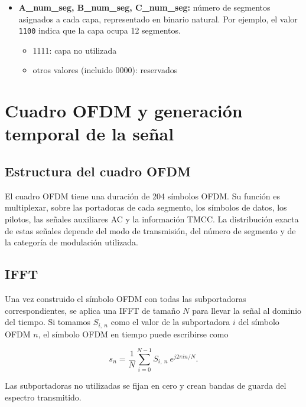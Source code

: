\begin{itemize}
\item \textbf{A\_num\_seg, B\_num\_seg, C\_num\_seg:} número de segmentos asignados a cada capa, representado en binario natural. Por ejemplo, el valor \texttt{1100} indica que la capa ocupa 12 segmentos.
\begin{itemize}
\item 1111: capa no utilizada
\item otros valores (incluido 0000): reservados
\end{itemize}

\end{itemize}


\section{Cuadro OFDM y generación temporal de la señal}

\subsection{Estructura del cuadro OFDM}

El cuadro OFDM tiene una duración de 204 símbolos OFDM. Su función es multiplexar, sobre las portadoras de cada segmento, los símbolos de datos, los pilotos, las señales auxiliares AC y la información TMCC. La distribución exacta de estas señales depende del modo de transmisión, del número de segmento y de la categoría de modulación utilizada.


\subsection{IFFT}

Una vez construido el símbolo OFDM con todas las subportadoras correspondientes, se aplica una IFFT de tamaño $N$ para llevar la señal al dominio del tiempo. Si tomamos $S_{i,\ n}$ como el valor de la subportadora $i$ del símbolo OFDM $n$, el símbolo OFDM en tiempo puede escribirse como

\begin{equation}
s_n =
\frac{1}{N}
\sum_{i=0}^{N-1}
S_{i,\ n}\ e^{j2\pi in/N}.
\end{equation}

Las subportadoras no utilizadas se fijan en cero y crean bandas de guarda del espectro transmitido.

